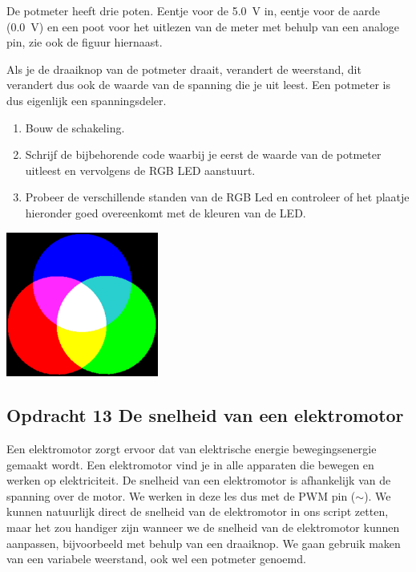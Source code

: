 \documentclass{arduino}
\begin{document}
De potmeter heeft drie poten. Eentje voor de \SI{5.0}{\volt} in, eentje voor de aarde (\SI{0.0}{\volt}) en een poot voor het uitlezen van de meter met behulp van een analoge pin, zie ook de figuur hiernaast.

Als je de draaiknop van de potmeter draait, verandert de weerstand, dit verandert dus ook de waarde van de spanning die je uit leest. Een potmeter is dus eigenlijk een spanningsdeler.

\begin{enumerate}[label={\alph*})]
\item Bouw de schakeling.

\item Schrijf de bijbehorende code waarbij je eerst de waarde van de potmeter uitleest en vervolgens de RGB LED aanstuurt.

\item Probeer de verschillende standen van de RGB Led en controleer of het plaatje hieronder goed overeenkomt met de kleuren van de LED.
\end{enumerate}

\begin{center}
\includegraphics[width=5cm]{26. Mixing colours}
\end{center}

\newpage

\subsection{Opdracht 13 De snelheid van een elektromotor}



Een elektromotor zorgt ervoor dat van elektrische energie bewegingsenergie gemaakt wordt. Een elektromotor vind je in alle apparaten die bewegen en werken op elektriciteit. De snelheid van een elektromotor is afhankelijk van de spanning over de motor. We werken in deze les dus met de PWM pin ($\sim$). We kunnen natuurlijk direct de snelheid van de elektromotor in ons script zetten, maar het zou handiger zijn wanneer we de snelheid van de elektromotor kunnen aanpassen, bijvoorbeeld met behulp van een draaiknop. We gaan gebruik maken van een variabele weerstand, ook wel een potmeter genoemd.
\end{document}
